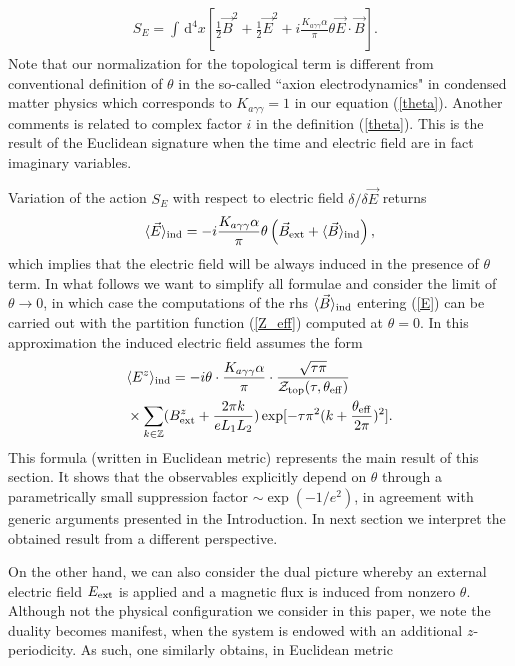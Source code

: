 \documentclass[ twocolumn,aps,prd,   
               preprintnumbers,numbers,sort&compress,nofootinbib,
                            showpacs,superscriptaddress,
               colorlinks,
               linkcolor=blue,   
               citecolor=blue]{revtex4-1}   \newcommand{\exclude}[1]{}
\newcommand{\be}{\begin{eqnarray}}
\newcommand{\ee}{\end{eqnarray}}
\def\dd{ \,\mathrm{d} }
\def\la{\langle}
\def\ra{\rangle}
\begin{document}
  \be
\label{theta}
S_E=\int \dd^4 x  \left[\frac{1}{2}\vec{B}^2+\frac{1}{2}\vec{E}^2+ i \frac{K_{a\gamma\gamma} \alpha}{\pi} {\theta} \vec{E}\cdot\vec{B}\right]. ~~~
 \ee
Note that our normalization for the topological term is different from conventional definition of $\theta$ in the so-called ``axion electrodynamics" in condensed matter physics  which corresponds to $K_{a\gamma\gamma}=1$ in our equation (\ref{theta}).  Another comments is related to complex factor $i$ in the definition (\ref{theta}). This is the result of the Euclidean signature when the  time and electric field are  in fact imaginary variables. 

Variation of the action $S_E$ with respect to electric field $\delta/\delta\vec{E}$ returns 
\be
\label{E}
\la \vec{E}\ra_{\rm ind}=-i  \frac{K_{a\gamma\gamma} \alpha}{\pi} {\theta} \left( \vec{B}_{\rm ext} + \la \vec{B}\ra_{\rm ind}\right),
\ee
 which implies that the electric field will be always induced in the presence of $\theta$ term.
 In what follows we want to simplify all formulae and consider the limit of $\theta\rightarrow 0$, in which case
 the computations of the rhs $  \la \vec{B}\ra_{\rm ind}$ entering (\ref{E}) can be carried out 
 with the partition function (\ref{Z_eff}) computed at $\theta=0$. In this approximation the induced electric field assumes the form
  \begin{align}
  \label{E_ind}
  &\la {E^z}\ra_{\rm ind}=-i  {\theta}\cdot  \frac{K_{a\gamma\gamma} \alpha}{\pi}\cdot  \frac{\sqrt{\tau \pi}}{{\cal Z}_{\rm top}(\tau, \theta_{\rm eff})}\\
  & \times \sum_{k \in \mathbb{Z}} (B^z_{\rm ext} +\frac{2 \pi k}{e L_1 L_2}) \exp[-\tau \pi^2(k+\frac{\theta_{\rm eff}}{2\pi})^2].\nonumber
  \end{align}
  This formula (written in Euclidean metric) represents the main result of this section.  It  shows that the   observables explicitly depend
  on $\theta$ through  a parametrically small suppression factor $\sim \exp(-1/e^2)$, in agreement with generic arguments presented in the Introduction.  In next section we interpret the obtained result 
   from a different perspective. 
 
On the other hand, we can also consider the dual picture whereby an external electric field $E_{\rm ext}$ is applied and a magnetic flux is induced from nonzero $\theta$. Although not the physical configuration we consider in this paper, we note the duality becomes manifest, when the system is endowed with an additional $z$-periodicity. As such, one similarly obtains, in Euclidean metric
\end{document}
